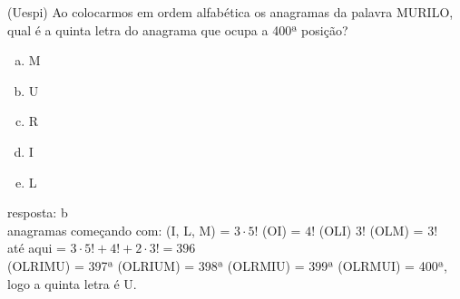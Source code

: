 \begin{ex}
(Uespi) Ao colocarmos em ordem alfabética os anagramas da palavra MURILO, qual é a quinta letra do anagrama que ocupa a 400ª posição?
   \begin{enumerate}[(a)]
   \item M
   \item U
   \item R
   \item I
   \item L
   \end{enumerate}
     \begin{sol}
      resposta: b \\
      anagramas começando com: (I, L, M) = $3\cdot5!$ \hspace{0,4cm}  (OI) = $4!$ \hspace{0,4cm} (OLI) $3!$\hspace{0,4cm}  (OLM) = $3!$\\
      até aqui = $3\cdot5!+4!+2\cdot3!=396$\\
      (OLRIMU) = 397ª \hspace{0,4cm} (OLRIUM) = 398ª \hspace{0,4cm}
      (OLRMIU) = 399ª \hspace{0,4cm}
      (OLRMUI) = 400ª, logo a quinta letra é U.
     \end{sol}
\end{ex}